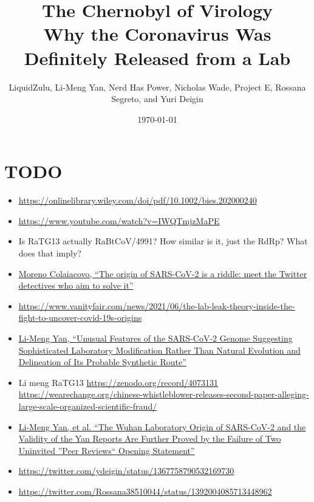 \documentclass[11pt]{article}
\author{LiquidZulu, Li-Meng Yan, Nerd Has Power, Nicholas Wade, Project E, Rossana Segreto, and Yuri Deigin}
\date{\today}
\title{The Chernobyl of Virology\\\medskip
\large Why the Coronavirus Was Definitely Released from a Lab}
\begin{document}
\maketitle
\tableofcontents


\section{TODO}
\label{sec:org2140e5e}
\begin{itemize}
\item \url{https://onlinelibrary.wiley.com/doi/pdf/10.1002/bies.202000240}
\item \url{https://www.youtube.com/watch?v=IWQTmjzMaPE}
\item Is RaTG13 actually RaBtCoV/4991? How similar is it, just the RdRp? What does that imply?
\item \href{https://mygenomix.medium.com/the-origin-of-sars-cov-2-is-a-riddle-meet-the-twitter-detectives-who-aim-to-solve-it-5050216fd279}{Moreno Colaiacovo, ``The origin of SARS-CoV-2 is a riddle: meet the Twitter detectives who aim to solve it''}
\item \url{https://www.vanityfair.com/news/2021/06/the-lab-leak-theory-inside-the-fight-to-uncover-covid-19s-origins}
\item \href{https://www.researchgate.net/publication/344240007\_Unusual\_Features\_of\_the\_SARS-CoV-2\_Genome\_Suggesting\_Sophisticated\_Laboratory\_Modification\_Rather\_Than\_Natural\_Evolution\_and\_Delineation\_of\_Its\_Probable\_Synthetic\_Route}{Li-Meng Yan, ``Unusual Features of the SARS-CoV-2 Genome Suggesting Sophisticated Laboratory Modification Rather Than Natural Evolution and Delineation of Its Probable Synthetic Route''}
\item Li meng RaTG13 \url{https://zenodo.org/record/4073131} \url{https://wearechange.org/chinese-whistleblower-releases-second-paper-alleging-large-scale-organized-scientific-fraud/}
\item \href{https://www.researchgate.net/publication/350523980\_The\_Wuhan\_Laboratory\_Origin\_of\_SARS-CoV-2\_and\_the\_Validity\_of\_the\_Yan\_Reports\_Are\_Further\_Proved\_by\_the\_Failure\_of\_Two\_Uninvited\_Peer\_Reviews\_Opening\_Statement}{Li-Meng Yan, et al. ``The Wuhan Laboratory Origin of SARS-CoV-2 and the Validity of the Yan Reports Are Further Proved by the Failure of Two Uninvited ''Peer Reviews`` Opening Statement''}
\item \url{https://twitter.com/ydeigin/status/1367758790532169730}
\item \url{https://twitter.com/Rossana38510044/status/1392004085713448962}

\end{itemize}
\end{document}
